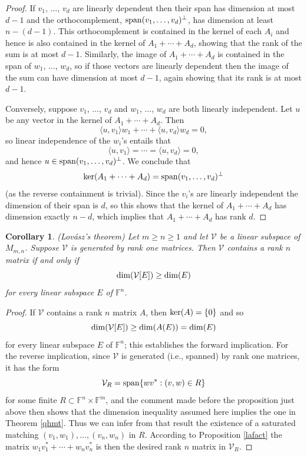 \documentclass{amsart}
\newtheorem{cor}[thm]{Corollary}
\theoremstyle{definition}
\begin{document}
\begin{proof}
If $v_1$, $\ldots$, $v_d$ are linearly dependent then their span has dimension at most $d - 1$ and the orthocomplement, ${\rm span}(v_1, \ldots, v_d)^\perp$, has dimension at least $n - (d - 1)$. This orthocomplement is contained in the kernel of each $A_i$ and hence is also contained in the kernel of $A_1 + \cdots + A_d$, showing that the rank of the sum is at most $d - 1$. Similarly, the image of $A_1 + \cdots + A_d$ is contained in the span of $w_1$, $\ldots$, $w_d$, so if those vectors are linearly dependent then the image of the sum can have dimension at most $d-1$, again showing that its rank is at most $d - 1$.

Conversely, suppose $v_1$, $\ldots$, $v_d$ and $w_1$, $\ldots$, $w_d$ are both linearly independent. Let $u$ be any vector in the kernel of $A_1 + \cdots + A_d$. Then $$\langle u, v_1\rangle w_1 + \cdots + \langle u, v_d\rangle w_d = 0,$$ so linear independence of the $w_i$'s entails that $$\langle u, v_1\rangle = \cdots = \langle u, v_d\rangle = 0,$$ and hence $u \in {\rm span}(v_1, \ldots, v_d)^\perp$. We conclude that $${\rm ker}(A_1 + \cdots + A_d) = {\rm span}(v_1, \ldots, v_d)^\perp$$ (as the reverse containment is trivial). Since the $v_i$'s are linearly independent the dimension of their span is $d$, so this shows that the kernel of $A_1 + \cdots + A_d$ has dimension exactly $n -d$, which implies that $A_1 + \cdots + A_d$ has rank $d$.
\end{proof}

\begin{cor} \label{qhmtl} (Lovász's theorem)
Let $m \geq n \geq 1$ and let $\mathcal{V}$ be a linear subspace of $M_{m,n}$. Suppose $\mathcal{V}$ is generated by rank one matrices. Then $\mathcal{V}$ contains a rank $n$ matrix if and only if $${\rm dim}(\mathcal{V}[E]) \geq {\rm dim}(E)$$ for every linear subspace $E$ of $\mathbb{F}^n$.
\end{cor}

\begin{proof}
If $\mathcal{V}$ contains a rank $n$ matrix $A$, then ${\rm ker}(A) = \{0\}$ and so $${\rm dim}(\mathcal{V}[E]) \geq {\rm dim}(A(E)) = {\rm dim}(E)$$ for every linear subspace $E$ of $\mathbb{F}^n$; this establishes the forward implication. For the reverse implication, since $\mathcal{V}$ is generated (i.e., spanned) by rank one matrices, it has the form $$\mathcal{V}_R = {\rm span}\{wv^*: (v,w) \in R\}$$ for some finite $R \subset \mathbb{F}^n \times \mathbb{F}^m$, and the comment made before the proposition just above then shows that the dimension inequality assumed here implies the one in Theorem \ref{qhmt}. Thus we can infer from that result the existence of a saturated matching $(v_1,w_1), \ldots, (v_n,w_n)$ in $R$. According to Proposition \ref{lafact} the matrix $w_1v_1^* + \cdots + w_nv_n^*$ is then the desired rank $n$ matrix in $\mathcal{V}_R$.
\end{proof}
\end{document}
